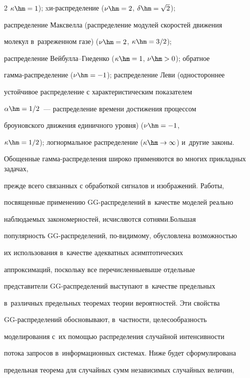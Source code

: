 \begin{multicols}{2}
$\kappa\hm=1$); xи-рас\-пре\-де\-ле\-ние ($\nu\hm=2$, $\delta\hm=\sqrt{2}$);


распределение Максвелла (распределение модулей скоростей движения


молекул в~разреженном газе) ($\nu\hm=2$, $\kappa\hm=3/2$);


распределение Вей\-бул\-ла--Гне\-ден\-ко ($\kappa\hm=1$, $\nu\hm>0$); обратное


гам\-ма-рас\-пре\-де\-ле\-ние ($\nu\hm=-1$); распределение Леви (одностороннее


устойчивое распределение с характеристическим показателем


$\alpha\hm=1/2$~--- распределение времени достижения процессом


броуновского движения единичного уровня) ($\nu\hm=-1$,


$\kappa\hm=1/2$); логнормальное распределение ($\kappa\hm\to\infty$) и~другие законы.





Обощенные гамма-распределения широко применяются во многих прикладных задачах,


прежде всего связанных с обработкой сигналов и изображений. Работы,


посвященные применению GG-рас\-пре\-де\-ле\-ний в~качестве моделей реально


наблюдаемых закономерностей, исчисляются сотнями.\linebreak Большая


популярность GG-рас\-пре\-де\-ле\-ний, по-ви\-ди\-мо\-му, обуслов\-ле\-на возможностью


их ис\-поль\-зо\-вания в~качестве адекватных асимптотических


аппроксимаций, поскольку все перечисленные\linebreak вы\-ше отдельные


представители GG-рас\-пре\-де\-ле\-ний выступают в~качестве предель\-ных 


в~различных предель\-ных тео\-ре\-мах тео\-рии вероятностей. Эти свойства


GG-распределений обосновывают, в~част\-ности, целесообразность


моделирования с~их по\-мощью распределения случайной интенсив\-ности


потока запросов в~информационных системах. Ниже будет сформулирована


предельная теорема для случайных сумм независимых случайных величин,



\end{multicols}
